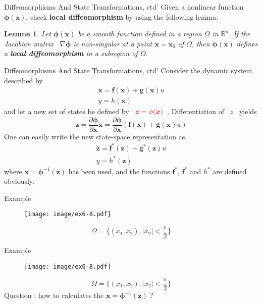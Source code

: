 \documentclass{beamer}
\renewcommand{\vec}[1]{\ensuremath{\boldsymbol{#1}}} %
\newtheorem{myLemma}{Lemma}[section]
\begin{document}
\begin{frame}{Diffeomorphisms And State Transformations, ctd'}
    Given a nonlinear function $\vec{\phi} (\vec{x})$, check \textbf{local diffeomorphism} by using the following lemma:

    \begin{myLemma} \label{lemma1}
        Let $\vec{\phi} (\vec{x})$ be a smooth function defined in a region $\Omega$ in $\mathbb{R}^{n}$. If the {\color{red}Jacobian matrix} ~$\nabla \vec{\phi}$ is {\color{red}non-singular} at a point $\vec{x}=\vec{x}_{0}$ of $\Omega$, then $\vec{\phi}(\vec{x})$ defines a \textbf{local diffeomorphism} in a subregion of $\Omega$.
    \end{myLemma}
\end{frame}


\begin{frame}{Diffeomorphisms And State Transformations, ctd'}
Consider the dynamic system described by
    $$
    \begin{array}{l}{\dot{\mathbf{x}}=\mathbf{f}(\mathbf{x})+\mathbf{g}(\mathbf{x}) u} \\ {y=h(\mathbf{x})}\end{array}
    $$
    and let a new set of states be defined by ~${\color{red}\vec{z}=\phi(\vec{x})}$~, Differentiation of ~$z$~ yields
    $$
    \dot{\mathbf{z}}=\frac{\partial \vec{\phi}}{\partial \mathbf{x}} \dot{\mathbf{x}}=\frac{\partial \vec{\phi}}{\partial \mathbf{x}}(\mathbf{f}(\mathbf{x})+\mathbf{g}(\mathbf{x}) u)
    $$
    One can easily write the new state-space representation as
    $$
    \begin{array}{l}{\dot{\vec{z}}=\vec{f}^{*}(\vec{z})+\vec{g}^{*}(\vec{z})u} \\ {y=h^{*}(\vec{z})}\end{array}
    $$
    where $\vec{x}=\vec{\phi}^{-1}(\vec{z})$ has been used, and the functions $\vec{f}^{*}$, $\vec{f}^{*}$ and $h^{*}$ are defined obviously.
\end{frame}


\begin{frame}{Example}
    \begin{figure}
      \centering
      \texttt{[image: image/ex6-8.pdf]}
    \end{figure}
    \vspace{-10pt}
    $$
    \Omega = \{ (x_{1}, x_{2}), |x_{2}| < \frac{\pi}{2} \}
    $$
\end{frame}
\begin{frame}{Example}
    \begin{figure}
      \centering
      \texttt{[image: image/ex6-8.pdf]}
    \end{figure}
    \vspace{-10pt}
    $$
    \Omega = \{ (x_{1}, x_{2}), |x_{2}| < \frac{\pi}{2} \}
    $$
    {\color{red}\large Question : how to calculates the $\vec{x}=\vec{\phi}^{-1}(\vec{z})$ ?}
\end{frame}
\end{document}
